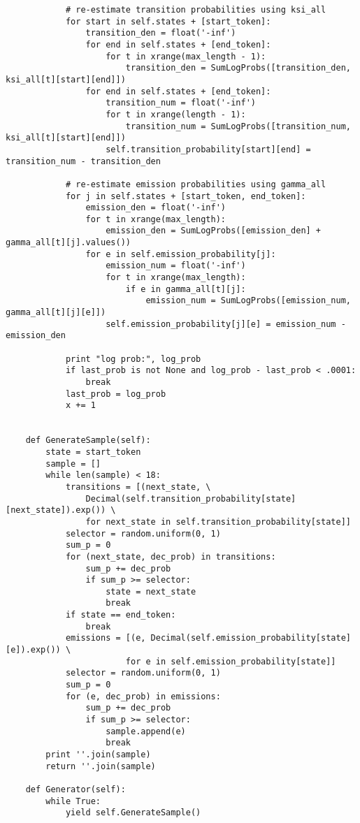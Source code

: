 \documentclass{amsart}
\theoremstyle{definition}
\theoremstyle{remark}
\numberwithin{equation}{section}
\begin{document}
\begin{lstlisting}
            # re-estimate transition probabilities using ksi_all
            for start in self.states + [start_token]:
                transition_den = float('-inf')
                for end in self.states + [end_token]:
                    for t in xrange(max_length - 1):
                        transition_den = SumLogProbs([transition_den, ksi_all[t][start][end]])
                for end in self.states + [end_token]:
                    transition_num = float('-inf')
                    for t in xrange(length - 1):
                        transition_num = SumLogProbs([transition_num, ksi_all[t][start][end]])
                    self.transition_probability[start][end] = transition_num - transition_den

            # re-estimate emission probabilities using gamma_all
            for j in self.states + [start_token, end_token]:
                emission_den = float('-inf')
                for t in xrange(max_length):
                    emission_den = SumLogProbs([emission_den] + gamma_all[t][j].values())
                for e in self.emission_probability[j]:
                    emission_num = float('-inf')
                    for t in xrange(max_length):
                        if e in gamma_all[t][j]:
                            emission_num = SumLogProbs([emission_num, gamma_all[t][j][e]])
                    self.emission_probability[j][e] = emission_num - emission_den

            print "log prob:", log_prob
            if last_prob is not None and log_prob - last_prob < .0001:
                break
            last_prob = log_prob
            x += 1


    def GenerateSample(self):
        state = start_token
        sample = []
        while len(sample) < 18:
            transitions = [(next_state, \
                Decimal(self.transition_probability[state][next_state]).exp()) \
                for next_state in self.transition_probability[state]]
            selector = random.uniform(0, 1)
            sum_p = 0
            for (next_state, dec_prob) in transitions:
                sum_p += dec_prob
                if sum_p >= selector:
                    state = next_state
                    break
            if state == end_token:
                break
            emissions = [(e, Decimal(self.emission_probability[state][e]).exp()) \
                        for e in self.emission_probability[state]]
            selector = random.uniform(0, 1)
            sum_p = 0
            for (e, dec_prob) in emissions:
                sum_p += dec_prob
                if sum_p >= selector:
                    sample.append(e)
                    break
        print ''.join(sample)
        return ''.join(sample)

    def Generator(self):
        while True:
            yield self.GenerateSample()

\end{lstlisting}
\end{document}
